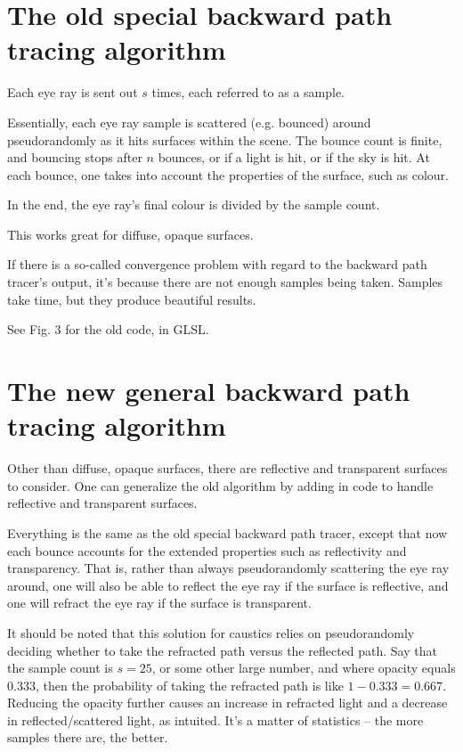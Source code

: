 \documentclass[12pt]{article}
\begin{document}
\section{The old special backward path tracing algorithm}

Each eye ray is sent out $s$ times, each referred to as a sample.

Essentially, each eye ray sample is scattered (e.g. bounced) around pseudorandomly as it hits surfaces within the scene.
The bounce count is finite, and bouncing stops after $n$ bounces, or if a light is hit, or if the sky is hit.
At each bounce, one takes into account the properties of the surface, such as colour.

In the end, the eye ray's final colour is divided by the sample count.

This works great for diffuse, opaque surfaces.

If there is a so-called convergence problem with regard to the backward path tracer's output, it's because there are not enough samples being taken.
Samples take time, but they produce beautiful results.

See Fig. 3 for the old code, in GLSL.





\section{The new general backward path tracing algorithm}

Other than diffuse, opaque surfaces, there are reflective and transparent surfaces to consider.
One can generalize the old algorithm by adding in code to handle reflective and transparent surfaces.

Everything is the same as the old special backward path tracer, except that now each bounce accounts for the extended properties such as reflectivity and transparency.
That is, rather than always pseudorandomly scattering the eye ray around, one will also be able to reflect the eye ray if the surface is reflective, and one will refract the eye ray if the surface is transparent.

It should be noted that this solution for caustics relies on pseudorandomly deciding whether to take the refracted path versus the reflected path.
Say that the sample count is $s = 25$, or some other large number, and where opacity equals $0.333$, then the probability of taking the refracted path is like $1 - 0.333 = 0.667$.
Reducing the opacity further causes an increase in refracted light and a decrease in reflected/scattered light, as intuited.
It's a matter of statistics -- the more samples there are, the better.
\end{document}
